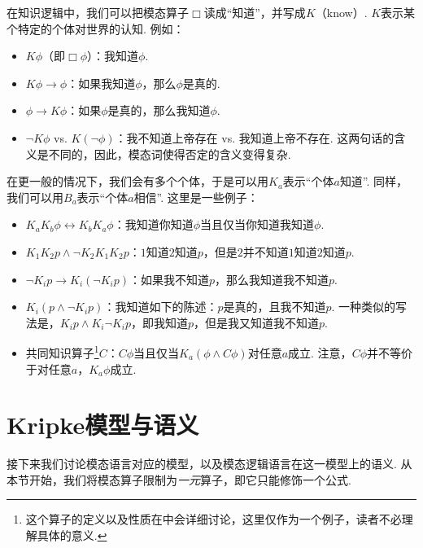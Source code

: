\begin{example}[知识逻辑]

在知识逻辑中，我们可以把模态算子$\Box$读成“知道”，并写成$K$（know）. $K$表示某个特定的个体对世界的认知. 例如：

\begin{itemize}
    \item $K\phi$（即$\Box\phi$）：我知道$\phi$. 
    \item $K\phi\to\phi$：如果我知道$\phi$，那么$\phi$是真的. 
    \item $\phi\to K\phi$：如果$\phi$是真的，那么我知道$\phi$. 
    \item $\neg K\phi$ vs. $K(\neg\phi)$：我不知道上帝存在 vs. 我知道上帝不存在. 这两句话的含义是不同的，因此，模态词使得否定的含义变得复杂. 
\end{itemize}

在更一般的情况下，我们会有多个个体，于是可以用$K_a$表示“个体$a$知道”. 同样，我们可以用$B_a$表示“个体$a$相信”. 这里是一些例子：

\begin{itemize}
    \item $K_aK_b\phi\leftrightarrow K_bK_a\phi$：我知道你知道$\phi$当且仅当你知道我知道$\phi$. 
    \item $K_1K_2p\wedge \neg K_2K_1K_2 p$：$1$知道$2$知道$p$，但是$2$并不知道$1$知道$2$知道$p$. 
    \item $\neg K_i p\to K_i(\neg K_i p)$：如果我不知道$p$，那么我知道我不知道$p$. 
    \item $K_i(p\wedge\neg K_i p)$：我知道如下的陈述：$p$是真的，且我不知道$p$. 一种类似的写法是，$K_ip\wedge K_i\neg K_ip$，即我知道$p$，但是我又知道我不知道$p$. 
    \item 共同知识算子\footnote{这个算子的定义以及性质在中会详细讨论，这里仅作为一个例子，读者不必理解具体的意义. }$C$：$C \phi$当且仅当$K_a(\phi\wedge C\phi)$对任意$a$成立. 注意，$C\phi$并不等价于对任意$a$，$K_a\phi$成立. 
\end{itemize}
\end{example}

\section{Kripke模型与语义}\label{sec:kripke-semantics}

接下来我们讨论模态语言对应的模型，以及模态逻辑语言在这一模型上的语义. 从本节开始，我们将模态算子限制为\textit{一元}算子，即它只能修饰一个公式. 

